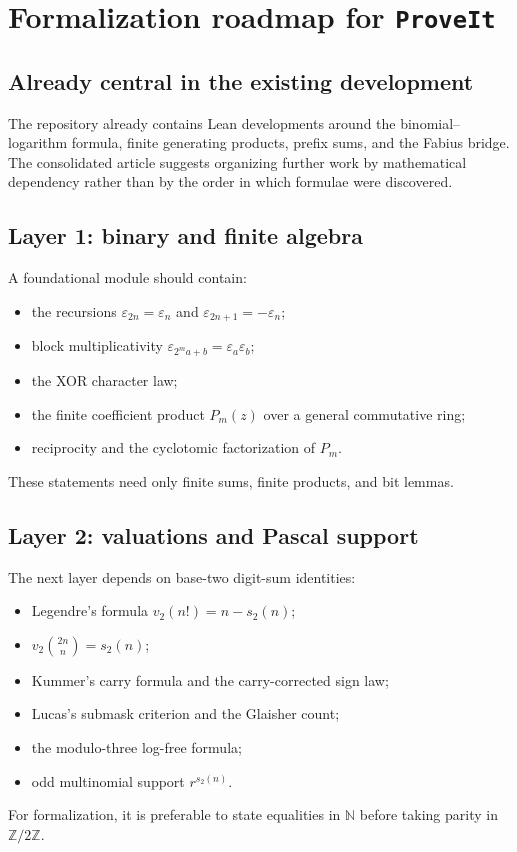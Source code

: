 \documentclass[11pt,oneside]{article}
\theoremstyle{definition}
\theoremstyle{remark}
\newcommand{\N}{\mathbb N}
\newcommand{\vtwo}{v_2}
\newcommand{\bitsum}{s_2}
\newcommand{\eps}{\varepsilon}
\begin{document}
\section{Formalization roadmap for \texttt{ProveIt}}

\subsection{Already central in the existing development}

The repository already contains Lean developments around the
binomial--logarithm formula, finite generating products, prefix sums, and the
Fabius bridge.  The consolidated article suggests organizing further work by
mathematical dependency rather than by the order in which formulae were
discovered.

\subsection{Layer 1: binary and finite algebra}

A foundational module should contain:
\begin{itemize}
 \item the recursions $\eps_{2n}=\eps_n$ and $\eps_{2n+1}=-\eps_n$;
 \item block multiplicativity $\eps_{2^ma+b}=\eps_a\eps_b$;
 \item the XOR character law;
 \item the finite coefficient product $P_m(z)$ over a general commutative ring;
 \item reciprocity and the cyclotomic factorization of $P_m$.
\end{itemize}
These statements need only finite sums, finite products, and bit lemmas.

\subsection{Layer 2: valuations and Pascal support}

The next layer depends on base-two digit-sum identities:
\begin{itemize}
 \item Legendre's formula $\vtwo(n!)=n-\bitsum(n)$;
 \item $\vtwo\binom{2n}{n}=\bitsum(n)$;
 \item Kummer's carry formula and the carry-corrected sign law;
 \item Lucas's submask criterion and the Glaisher count;
 \item the modulo-three log-free formula;
 \item odd multinomial support $r^{\bitsum(n)}$.
\end{itemize}
For formalization, it is preferable to state equalities in $\N$ before taking
parity in $\mathbb Z/2\mathbb Z$.
\end{document}
